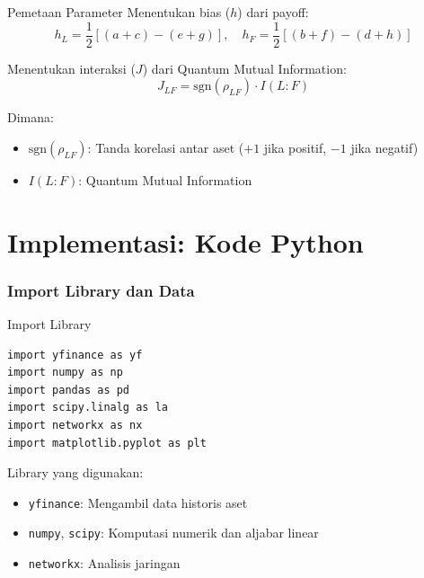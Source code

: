 \documentclass[aspectratio=169]{beamer}
\begin{document}
\begin{frame}{Pemetaan Parameter}
    Menentukan bias ($h$) dari payoff:
    \begin{equation}
        h_L = \frac{1}{2}\left[(a+c) - (e+g)\right], \quad h_F = \frac{1}{2}\left[(b+f) - (d+h)\right]
    \end{equation}
    
    \vspace{0.3cm}
    
    Menentukan interaksi ($J$) dari Quantum Mutual Information:
    \begin{equation}
        J_{LF} = \text{sgn}(\rho_{LF}) \cdot I(L:F)
    \end{equation}
    
    \small
    Dimana:
    \begin{itemize}
        \item $\text{sgn}(\rho_{LF})$: Tanda korelasi antar aset ($+1$ jika positif, $-1$ jika negatif)
        \item $I(L:F)$: Quantum Mutual Information
    \end{itemize}
\end{frame}


\part{Implementasi: Kode Python}
\frame{\partpage}

\section{Import Library dan Data}

\begin{frame}[fragile]{Import Library}
\begin{lstlisting}
import yfinance as yf
import numpy as np
import pandas as pd
import scipy.linalg as la
import networkx as nx
import matplotlib.pyplot as plt
\end{lstlisting}

\vspace{0.3cm}
Library yang digunakan:
\begin{itemize}
    \item \texttt{yfinance}: Mengambil data historis aset
    \item \texttt{numpy}, \texttt{scipy}: Komputasi numerik dan aljabar linear
    \item \texttt{networkx}: Analisis jaringan
\end{itemize}
\end{frame}
\end{document}
